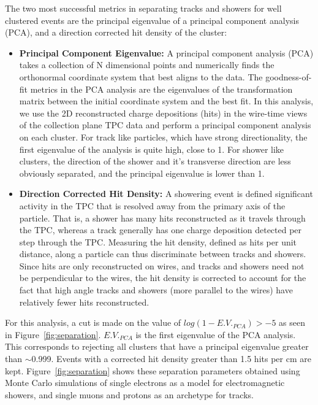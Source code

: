 The two most successful metrics in separating tracks and showers for well clustered events are the principal eigenvalue of a principal component analysis (PCA), and a direction corrected hit density of the cluster:
\begin{itemize}
  \item {\bf Principal Component Eigenvalue:} A principal component analysis (PCA) \cite{PCA} takes a collection of N dimensional points and numerically finds the orthonormal coordinate system that best aligns to the data.  The goodness-of-fit metrics in the PCA analysis are the eigenvalues of the transformation matrix between the initial coordinate system and the best fit.  In this analysis, we use the 2D reconstructed charge depositions (hits) in the wire-time views of the collection plane TPC data and perform a principal component analysis on each cluster.  For track like particles, which have strong directionality, the first eigenvalue of the analysis is quite high, close to 1.  For shower like clusters, the direction of the shower and it's transverse direction are less obviously separated, and the principal eigenvalue is lower than 1.  
  \item{\bf Direction Corrected Hit Density:}  A showering event is defined significant activity in the TPC that is resolved away from the primary axis of the particle.  That is, a shower has many hits reconstructed as it travels through the TPC, whereas a track generally has one charge deposition detected per step through the TPC.  Measuring the hit density, defined as hits per unit distance, along a particle can thus discriminate between tracks and showers.  Since hits are only reconstructed on wires, and tracks and showers need not be perpendicular to the wires, the hit density is corrected to account for the fact that high angle tracks and showers (more parallel to the wires) have relatively fewer hits reconstructed.
 \end{itemize}


For this analysis, a cut is made on the value of $log(1-E.V._{PCA}) > -5$ as seen in Figure~\ref{fig:separation}.  $E.V._{PCA}$ is the first eigenvalue of the PCA analysis.  This corresponds to rejecting all clusters that have a principal eigenvalue greater than $\sim$0.999.  Events with a corrected hit density greater than 1.5 hits per cm are kept.  Figure~\ref{fig:separation} shows these separation parameters obtained using Monte Carlo simulations of single electrons as a model for electromagnetic showers, and single muons and protons as an archetype for tracks. 

